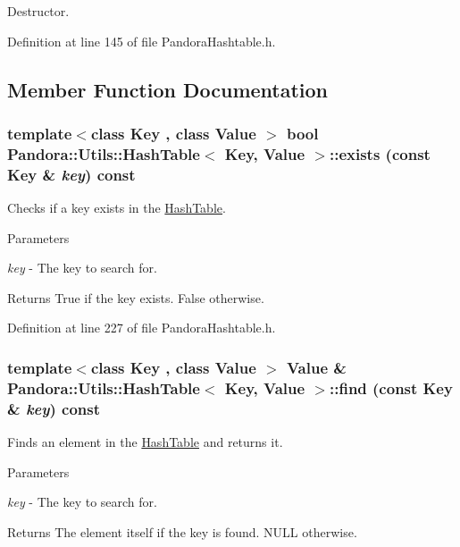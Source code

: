 Destructor. 

Definition at line 145 of file PandoraHashtable.h.

\subsection{Member Function Documentation}
\hypertarget{classPandora_1_1Utils_1_1HashTable_a61bb5ce54f3380c10edebb59cac114cd}{
\subsubsection[{exists}]{\setlength{\rightskip}{0pt plus 5cm}template$<$class Key , class Value $>$ bool {\bf Pandora::Utils::HashTable}$<$ Key, Value $>$::exists (const Key \& {\em key}) const}}
\label{classPandora_1_1Utils_1_1HashTable_a61bb5ce54f3380c10edebb59cac114cd}


Checks if a key exists in the \hyperlink{classPandora_1_1Utils_1_1HashTable}{HashTable}. 
\begin{DoxyParams}{Parameters}
\item[{\em key}]-\/ The key to search for. \end{DoxyParams}
\begin{DoxyReturn}{Returns}
True if the key exists. False otherwise. 
\end{DoxyReturn}


Definition at line 227 of file PandoraHashtable.h.\hypertarget{classPandora_1_1Utils_1_1HashTable_ab1aae3564898a1de7870930f7e678de0}{
\subsubsection[{find}]{\setlength{\rightskip}{0pt plus 5cm}template$<$class Key , class Value $>$ Value \& {\bf Pandora::Utils::HashTable}$<$ Key, Value $>$::find (const Key \& {\em key}) const}}
\label{classPandora_1_1Utils_1_1HashTable_ab1aae3564898a1de7870930f7e678de0}


Finds an element in the \hyperlink{classPandora_1_1Utils_1_1HashTable}{HashTable} and returns it. 
\begin{DoxyParams}{Parameters}
\item[{\em key}]-\/ The key to search for. \end{DoxyParams}
\begin{DoxyReturn}{Returns}
The element itself if the key is found. NULL otherwise. 
\end{DoxyReturn}


